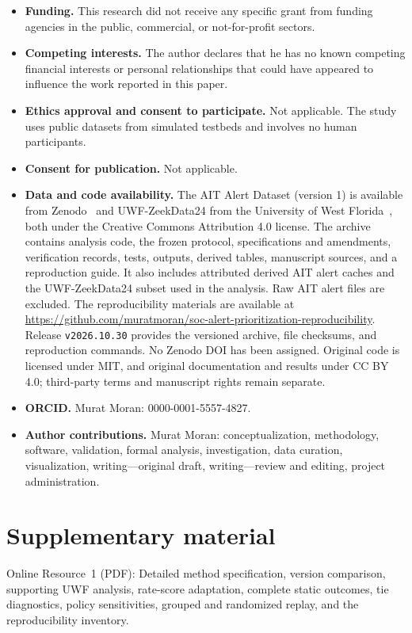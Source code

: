 \documentclass[pdflatex,sn-basic,Numbered]{sn-jnl}
\begin{document}
\begin{itemize}[leftmargin=*]
\item \textbf{Funding.} This research did not receive any specific grant from funding agencies in the public, commercial, or not-for-profit sectors.
\item \textbf{Competing interests.} The author declares that he has no known competing financial interests or personal relationships that could have appeared to influence the work reported in this paper.
\item \textbf{Ethics approval and consent to participate.} Not applicable. The study uses public datasets from simulated testbeds and involves no human participants.
\item \textbf{Consent for publication.} Not applicable.
\item \textbf{Data and code availability.} The AIT Alert Dataset (version 1) is available from Zenodo~\citep{AITAlertDataset2023} and UWF-ZeekData24 from the University of West Florida~\citep{Elam2025UWFZeekData24,UWFDatasetsPortal}, both under the Creative Commons Attribution 4.0 license. The archive contains analysis code, the frozen protocol, specifications and amendments, verification records, tests, outputs, derived tables, manuscript sources, and a reproduction guide. It also includes attributed derived AIT alert caches and the UWF-ZeekData24 subset used in the analysis. Raw AIT alert files are excluded. The reproducibility materials are available at \url{https://github.com/muratmoran/soc-alert-prioritization-reproducibility}. Release \texttt{v2026.10.30} provides the versioned archive, file checksums, and reproduction commands. No Zenodo DOI has been assigned. Original code is licensed under MIT, and original documentation and results under CC BY 4.0; third-party terms and manuscript rights remain separate.
\item \textbf{ORCID.} Murat Moran: 0000-0001-5557-4827.
\item \textbf{Author contributions.} Murat Moran: conceptualization, methodology, software, validation, formal analysis, investigation, data curation, visualization, writing---original draft, writing---review and editing, project administration.
\end{itemize}


\section*{Supplementary material}
Online Resource~1 (PDF): Detailed method specification, version comparison, supporting UWF analysis, rate-score adaptation, complete static outcomes, tie diagnostics, policy sensitivities, grouped and randomized replay, and the reproducibility inventory.


\end{document}
